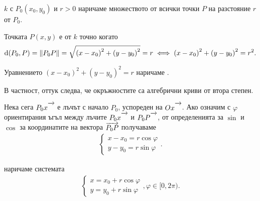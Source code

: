 \documentclass[numbers=endperiod, bibliography=totocnumbered]{scrartcl}
\begin{document}
\begin{definition}
   \( k \) с  \( P_0(x_0, y_0) \) и  \( r > 0 \) наричаме множеството от всички точки \( P \) на разстояние \( r \) от \( P_0 \).

  Точката \( P(x, y) \) е от \( k \) точно когато
  \begin{align*}
    \operatorname{d}(P_0, P)
    =
    \left\Vert P_0 P \right\Vert
    =
    \sqrt{{(x - x_0)}^2 + {(y - y_0)}^2} = r
    \iff
    {(x - x_0)}^2 + {(y - y_0)}^2 = r^2.
  \end{align*}

  Уравнението \( {(x - x_0)}^2 + {(y - y_0)}^2 = r \) наричаме .

  В частност, оттук следва, че окръжностите са алгебрични криви от втора степен.

  \bigskip
  \begin{minipage}{0.45\textwidth}
    Нека сега \( P_0 x\Ray \) е лъчът с начало \( P_0 \), успореден на \( Ox\Ray \). Ако означим с \( \varphi \) ориентирания ъгъл между лъчите \( P_0x\Ray \) и \( P_0 P\Ray \), от определенията за \( \sin \) и \( \cos \) за координатите на вектора \( \overrightarrow{P_0 P} \) получаваме
    \begin{align*}
      \begin{cases}
        x - x_0 = r \cos \varphi \\
        y - y_0 = r \sin \varphi
      \end{cases}.
    \end{align*}

     наричаме системата
    \begin{align*}
      \begin{cases}
        x = x_0 + r \cos \varphi \\
        y = y_0 + r \sin \varphi
      \end{cases},
      \varphi \in [0, 2\pi).
    \end{align*}
  \end{minipage}
  \begin{minipage}{0.45\textwidth}
    \begin{figure}[H]
      \begin{Center}
\end{Center}
\end{figure}
\end{minipage}
\end{definition}
\end{document}
